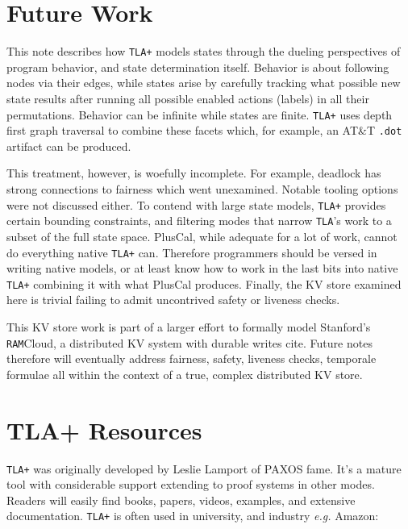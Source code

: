 \documentclass[twocolumn]{article}
\begin{document}
\section{Future Work}
This note describes how \texttt{TLA+} models states through the dueling perspectives of program behavior, and state determination itself. Behavior is about following nodes via their edges, while states arise by carefully tracking what possible new state results after running all possible enabled actions (labels) in all their permutations. Behavior can be infinite while states are finite. \texttt{TLA+} uses depth first graph traversal to combine these facets which, for example, an AT\&T \texttt{.dot} artifact can be produced.

This treatment, however, is woefully incomplete. For example, deadlock has strong connections to fairness which went unexamined. Notable tooling options were not discussed either. To contend with large state models, \texttt{TLA+} provides certain bounding constraints, and filtering modes that narrow \texttt{TLA}'s work to a subset of the full state space. PlusCal, while adequate for a lot of work, cannot do everything native \texttt{TLA+} can. Therefore programmers should be versed in writing native models, or at least know how to work in the last bits into native \texttt{TLA+} combining it with what PlusCal produces. Finally, the KV store examined here is trivial failing to admit uncontrived safety or liveness checks. 

This KV store work is part of a larger effort to formally model Stanford's \texttt{RAM}Cloud, a distributed KV system with durable writes cite. Future notes therefore will eventually address fairness, safety, liveness checks, temporale formulae all within the context of a true, complex distributed KV store.

\section{TLA+ Resources}
\texttt{TLA+} was originally developed by Leslie Lamport of PAXOS fame. It's a mature tool with considerable support extending to proof systems in other modes. Readers will easily find books, papers, videos, examples, and extensive documentation. \texttt{TLA+} is often used in university, and industry \emph{e.g.} Amazon:
\end{document}
